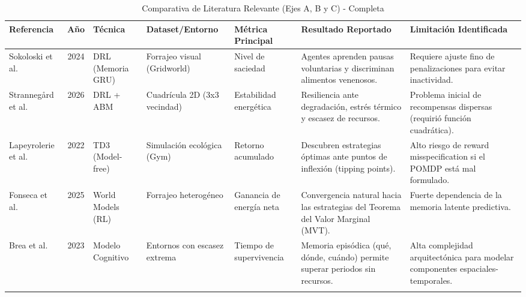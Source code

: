 \documentclass[conference]{IEEEtran}
\begin{document}
\begin{table}[tbp]
\centering
\caption{Comparativa de Literatura Relevante (Ejes A, B y C) - Completa}
\label{tab:comparativa_completa}
\scriptsize
\begin{tabular}{p{1.6cm} c p{2.0cm} p{2.0cm} p{2.2cm} p{3.5cm} p{3.4cm}}
\toprule
\textbf{Referencia} & \textbf{Año} & \textbf{Técnica} & \textbf{Dataset/Entorno} & \textbf{Métrica Principal} & \textbf{Resultado Reportado} & \textbf{Limitación Identificada} \\
\midrule

Sokoloski et al. \cite{Paper1} &
2024 &
DRL (Memoria GRU) &
Forrajeo visual (Gridworld) &
Nivel de saciedad &
Agentes aprenden pausas voluntarias y discriminan alimentos venenosos. &
Requiere ajuste fino de penalizaciones para evitar inactividad. \\

\addlinespace

Strannegård et al. \cite{Paper2} &
2026 &
DRL + ABM &
Cuadrícula 2D (3x3 vecindad) &
Estabilidad energética &
Resiliencia ante degradación, estrés térmico y escasez de recursos. &
Problema inicial de recompensas dispersas (requirió función cuadrática). \\

\addlinespace

Lapeyrolerie et al. \cite{Paper3} &
2022 &
TD3 (Model-free) &
Simulación ecológica (Gym) &
Retorno acumulado &
Descubren estrategias óptimas ante puntos de inflexión (tipping points). &
Alto riesgo de reward misspecification si el POMDP está mal formulado. \\

\addlinespace

Fonseca et al. \cite{Paper4} &
2025 &
World Models (RL) &
Forrajeo heterogéneo &
Ganancia de energía neta &
Convergencia natural hacia las estrategias del Teorema del Valor Marginal (MVT). &
Fuerte dependencia de la memoria latente predictiva. \\

\addlinespace

Brea et al. \cite{Paper5} &
2023 &
Modelo Cognitivo &
Entornos con escasez extrema &
Tiempo de supervivencia &
Memoria episódica (qué, dónde, cuándo) permite superar periodos sin recursos. &
Alta complejidad arquitectónica para modelar componentes espaciales-temporales. \\

\addlinespace


\end{tabular}
\end{table}
\end{document}
